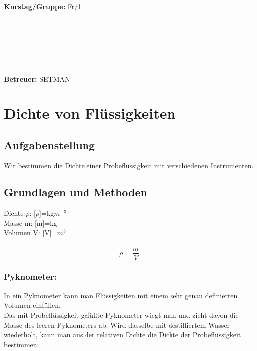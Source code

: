 \documentclass{article}
\begin{document}
\begin{verbatim}


\end{verbatim}
			\begin{flushleft}
			\textbf{\Large{Kurstag/Gruppe:}} \Large{Fr/1}
			\end{flushleft}

\begin{verbatim}






\end{verbatim}
			\begin{flushleft}
			\LARGE{\textbf{Betreuer:}}	\Large{SETMAN}	
			\end{flushleft}

\section{Dichte von Flüssigkeiten}
\subsection{Aufgabenstellung}
Wir bestimmen die Dichte einer Probeflüssigkeit mit verschiedenen Instrumenten.


\subsection{Grundlagen und Methoden}
Dichte $\rho$: [$\rho$]=kg$m^{-3}$\\
Masse m: [m]=kg\\
Volumen V: [V]=$m^3$\\
\\
\begin{equation}
\rho = \frac{m}{V}
\end{equation}

\subsubsection*{Pyknometer:}
In ein Pyknometer kann man Flüssigkeiten mit einem sehr genau definierten Volumen einfüllen.\\
Das mit Probeflüssigkeit gefüllte Pyknometer wiegt man und zieht davon die Masse des leeren Pyknometers ab. Wird dasselbe mit destilliertem Wasser wiederholt, kann man aus der relativen Dichte die Dichte der Probeflüssigkeit bestimmen: \\
\end{document}
